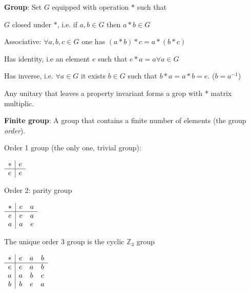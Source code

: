\begin{squishlist}
    \item \textbf{Group}: Set $G$ equipped with operation $*$ such that
    \begin{squishitemize}
        \setlength\itemsep{2pt}
        \item $G$ closed under $*$, i.e. if $a,b \in G$ then $a*b \in G$
        \item Associative: $\forall a,b,c \in G$ one has $(a * b) * c = a * (b*c)$
        \item Has identity, i.e an element $e$ such that $e * a = a \forall a \in G$
        \item Has inverse, i.e. $\forall a \in G$ it exists $b \in G$ such that $b*a = a*b = e$. ($b = a^{-1}$)
    \end{squishitemize}
    \item Any unitary that leaves a property invariant forms a grop with * matrix multiplic.
    \item \textbf{Finite group}: A group that contains a finite number of elements (the group \emph{order}).
    
    \begin{minipage}{0.75\columnwidth}
    \item Order 1 group (the only one, trivial group): 
    \end{minipage}
    \begin{minipage}{0.25\columnwidth}
    $\begin{array}{c | c }
        * & e \\
        \hline
        e & e 
    \end{array}$
    \end{minipage}

    \begin{minipage}{0.75\columnwidth}
    \item Order 2: parity group
    \end{minipage}
    \begin{minipage}{0.25\columnwidth}
    $\begin{array}{c | c c }
        * & e & a \\
        \hline
        e & e & a \\
        a & a & e
    \end{array}$
    \end{minipage}
    
    \begin{minipage}{0.75\columnwidth}
    \item The unique order 3 group is the cyclic $\mathbb{Z}_3$ group
    \end{minipage}
    \begin{minipage}{0.25\columnwidth}
        $\begin{array}{c| c c c}
            * & e & a & b \\
            \hline
            e & e & a & b \\
            a & a & b & e \\
            b & b & e & a \\
        \end{array}$
    \end{minipage}
        

\end{squishlist}
